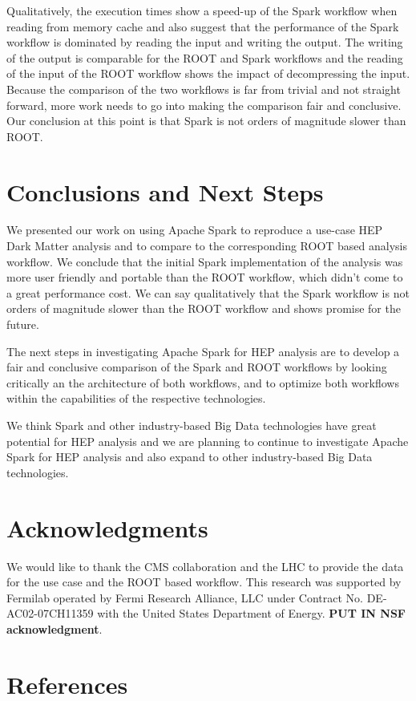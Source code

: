 \documentclass[a4paper]{jpconf}
\begin{document}
Qualitatively, the execution times show a speed-up of the Spark workflow when reading from memory cache and also suggest that the performance of the Spark workflow is dominated by reading the input and writing the output. The writing of the output is comparable for the ROOT and Spark workflows and the reading of the input of the ROOT workflow shows the impact of decompressing the input. Because the comparison of the two workflows is far from trivial and not straight forward, more work needs to go into making the comparison fair and conclusive. Our conclusion at this point is that Spark is not orders of magnitude slower than ROOT.

\section{Conclusions and Next Steps}

We presented our work on using Apache Spark to reproduce a use-case HEP Dark Matter analysis and to compare to the corresponding ROOT based analysis workflow. We conclude that the initial Spark implementation of the analysis was more user friendly and portable than the ROOT workflow, which didn't come to a great performance cost. We can say qualitatively that the Spark workflow is not orders of magnitude slower than the ROOT workflow and shows promise for the future.

The next steps in investigating Apache Spark for HEP analysis are to develop a fair and conclusive comparison of the Spark and ROOT workflows by looking critically an the architecture of both workflows, and to optimize both workflows within the capabilities of the respective technologies.

We think Spark and other industry-based Big Data technologies have great potential for HEP analysis and we are planning to continue to investigate Apache Spark for HEP analysis and also expand to other industry-based Big Data technologies.

\section{Acknowledgments}

We would like to thank the CMS collaboration and the LHC to provide the data for the use case and the ROOT based workflow. This research was supported by Fermilab operated by Fermi Research Alliance, LLC under Contract No. DE-AC02-07CH11359 with the United States Department of Energy. {\bf PUT IN NSF acknowledgment}.

\section*{References}

\end{document}
